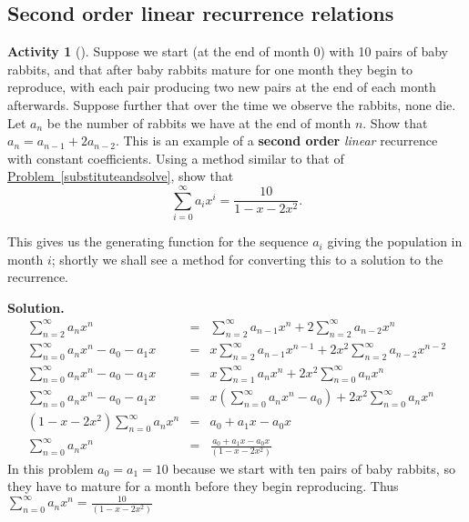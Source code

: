 \documentclass[10pt,]{book}
\newcommand{\terminology}[1]{\textbf{#1}}
\theoremstyle{plain}
\theoremstyle{definition}
\newtheorem{activity}[project]{Activity}
\numberwithin{equation}{chapter}
\newcommand{\amp}{&}
\begin{document}
\subsection[{Second order linear recurrence relations}]{Second order linear recurrence relations}\label{subsection-48}
\begin{activity}[]\label{secondorderintroduction}
Suppose we start (at the end of month 0) with 10 pairs of baby rabbits, and that after baby rabbits mature for one month they begin to reproduce, with each pair producing two new pairs at the end of each month afterwards. Suppose further that over the time we observe the rabbits, none die. Let \(a_n\) be the number of rabbits we have at the end of month \(n\). Show that \(a_n=a_{n-1} + 2a_{n-2}\). This is an example of a \terminology{second order} \emph{linear} recurrence with constant coefficients. Using a method similar to that of \hyperref[substituteandsolve]{Problem~\ref{substituteandsolve}}, show that%
\begin{equation*}
\sum_{i=0}^\infty a_ix^i = \frac{10}{1-x-2x^2}.
\end{equation*}
%
\par
This gives us the generating function for the sequence \(a_i\) giving the population in month \(i\); shortly we shall see a method for converting this to a solution to the recurrence.%
\par\medskip\noindent%
\textbf{Solution.}\quad %
\begin{align*}
\sum_{n=2}^\infty a_nx^n\amp =\amp \sum_{n=2}^\infty a_{n-1}x^n +
2\sum_{n=2}^\infty a_{n-2}x^n\\
\sum_{n=0}^\infty a_nx^n -a_0-a_1x \amp =\amp x\sum_{n=2}^\infty a_{n-1}x^{n-1} +
2x^2\sum_{n=2}^\infty a_{n-2}x^{n-2}\\
\sum_{n=0}^\infty a_nx^n -a_0-a_1x\amp =\amp x\sum_{n=1}^\infty a_{n}x^{n} +
2x^2\sum_{n=0}^\infty a_{n}x^n\\
\sum_{n=0}^\infty a_nx^n -a_0-a_1x\amp =\amp x\left(\sum_{n=0}^\infty
a_{n}x^{n}-a_0\right) + 2x^2\sum_{n=0}^\infty a_{n}x^n\\
(1-x-2x^2)\sum_{n=0}^\infty a_nx^n\amp =\amp a_0+a_1x-a_0x\\
\sum_{n=0}^\infty a_nx^n\amp =\amp \frac{a_0+a_1x-a_0x}{(1-x-2x^2)}
\end{align*}
In this problem \(a_0=a_1=10\) because we start with ten pairs of baby rabbits, so they have to mature for a month before they begin reproducing. Thus \(\displaystyle\sum_{n=0}^\infty a_nx^n = \frac{10}{(1-x-2x^2)}\)%
\end{activity}
\end{document}

